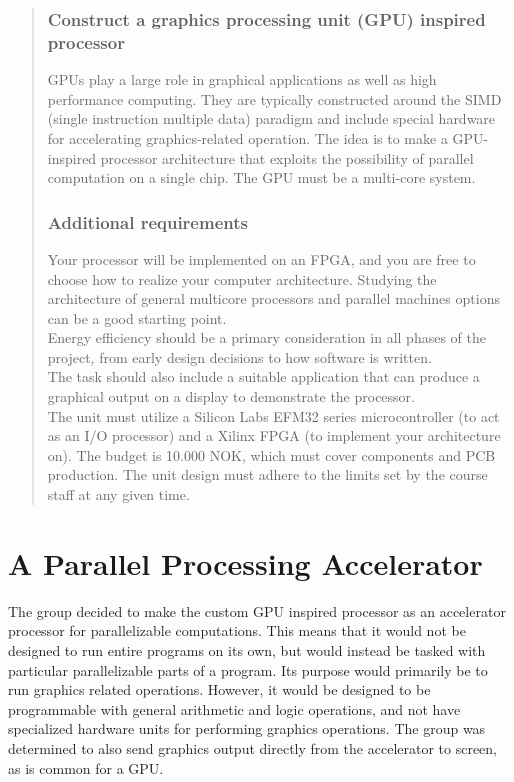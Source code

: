 \documentclass[../main/report.tex]{subfiles}
\begin{document}
\begin{quotation}

	\subsubsection{Construct a graphics processing unit (GPU) inspired processor}
    \noindent GPUs play a large role in graphical applications as well as high performance computing.
    They are typically constructed around the SIMD (single instruction multiple data) paradigm and
    include special hardware for accelerating graphics-related operation. The idea is to make a
    GPU-inspired processor architecture that exploits the possibility of parallel computation on a
    single chip. The GPU must be a multi-core system.
    
    \subsubsection{Additional requirements}
    \noindent Your processor will be implemented on an FPGA, and you are free to choose how to
    realize your computer architecture. Studying the architecture of general multicore processors
    and parallel machines options can be a good starting point.\\
    
    \noindent Energy efficiency should be a primary consideration in all phases of the project, from early
    design decisions to how software is written.\\
    
    \noindent The task should also include a suitable application that can produce a graphical output on a
    display to demonstrate the processor.\\
    
    \noindent The unit must utilize a Silicon Labs EFM32 series microcontroller (to act as an I/O processor)
    and a Xilinx FPGA (to implement your architecture on). The budget is 10.000 NOK, which must
    cover components and PCB production. The unit design must adhere to the limits set by the
    course staff at any given time.
\end{quotation}
\newpage

\section{A Parallel Processing Accelerator}

The group decided to make the custom GPU inspired processor as an accelerator processor for parallelizable computations.
This means that it would not be designed to run entire programs on its own, but would instead be tasked with particular parallelizable parts of a program.
Its purpose would primarily be to run graphics related operations.
However, it would be designed to be programmable with general arithmetic and logic operations, and not have specialized hardware units for performing graphics operations.
The group was determined to also send graphics output directly from the accelerator to screen, as is common for a GPU.
\end{document}
